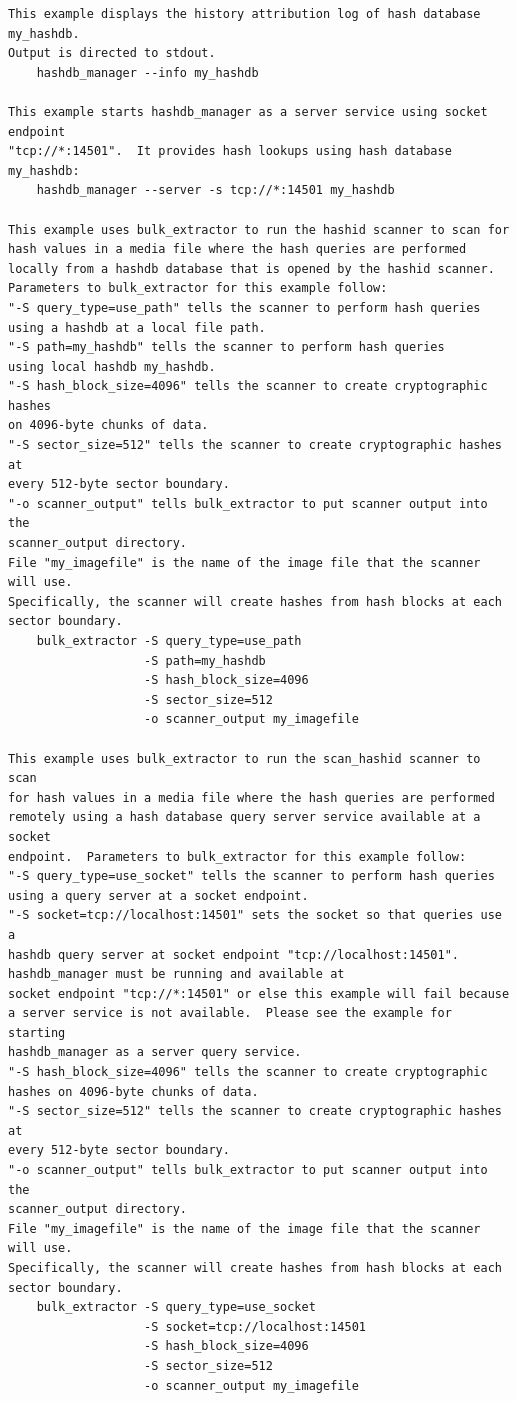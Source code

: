 \documentclass[11pt,twoside]{article}
\begin{document}
\begin{small}
\begin{verbatim}
This example displays the history attribution log of hash database my_hashdb.
Output is directed to stdout.
    hashdb_manager --info my_hashdb

This example starts hashdb_manager as a server service using socket endpoint
"tcp://*:14501".  It provides hash lookups using hash database my_hashdb:
    hashdb_manager --server -s tcp://*:14501 my_hashdb

This example uses bulk_extractor to run the hashid scanner to scan for
hash values in a media file where the hash queries are performed
locally from a hashdb database that is opened by the hashid scanner.
Parameters to bulk_extractor for this example follow:
"-S query_type=use_path" tells the scanner to perform hash queries
using a hashdb at a local file path.
"-S path=my_hashdb" tells the scanner to perform hash queries
using local hashdb my_hashdb.
"-S hash_block_size=4096" tells the scanner to create cryptographic hashes
on 4096-byte chunks of data.
"-S sector_size=512" tells the scanner to create cryptographic hashes at
every 512-byte sector boundary.
"-o scanner_output" tells bulk_extractor to put scanner output into the
scanner_output directory.
File "my_imagefile" is the name of the image file that the scanner will use.
Specifically, the scanner will create hashes from hash blocks at each
sector boundary.
    bulk_extractor -S query_type=use_path
                   -S path=my_hashdb
                   -S hash_block_size=4096
                   -S sector_size=512
                   -o scanner_output my_imagefile

This example uses bulk_extractor to run the scan_hashid scanner to scan
for hash values in a media file where the hash queries are performed
remotely using a hash database query server service available at a socket
endpoint.  Parameters to bulk_extractor for this example follow:
"-S query_type=use_socket" tells the scanner to perform hash queries
using a query server at a socket endpoint.
"-S socket=tcp://localhost:14501" sets the socket so that queries use a
hashdb query server at socket endpoint "tcp://localhost:14501".
hashdb_manager must be running and available at
socket endpoint "tcp://*:14501" or else this example will fail because
a server service is not available.  Please see the example for starting
hashdb_manager as a server query service.
"-S hash_block_size=4096" tells the scanner to create cryptographic
hashes on 4096-byte chunks of data.
"-S sector_size=512" tells the scanner to create cryptographic hashes at
every 512-byte sector boundary.
"-o scanner_output" tells bulk_extractor to put scanner output into the
scanner_output directory.
File "my_imagefile" is the name of the image file that the scanner will use.
Specifically, the scanner will create hashes from hash blocks at each
sector boundary.
    bulk_extractor -S query_type=use_socket
                   -S socket=tcp://localhost:14501
                   -S hash_block_size=4096
                   -S sector_size=512
                   -o scanner_output my_imagefile


\end{verbatim}
\end{small}
\end{document}
